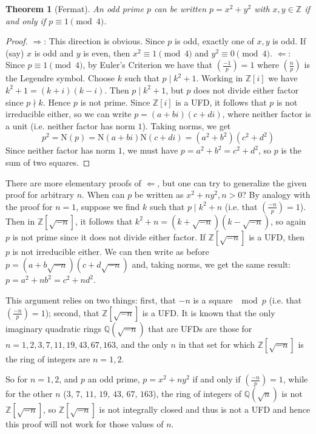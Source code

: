 \documentclass[12pt]{article}
\newcommand{\BZ}{\mathbb{Z}}
\newcommand{\BQ}{\mathbb{Q}}
\newtheorem{thm}{Theorem}
\begin{document}
\begin{thm}[Fermat] An odd prime $p$ can be written $p=x^2+y^2$ with $x,y\in\BZ$ if and only if $p \equiv 1 \pmod 4$.
\end{thm}

\begin{proof}
$\Rightarrow$: This direction is obvious. Since $p$ is odd, exactly one of $x,y$ is odd. If (say) $x$ is odd and $y$ is even, then $x^2\equiv 1\pmod 4$ and $y^2\equiv 0\pmod 4$.
\newline
$\Leftarrow$: Since $p \equiv 1 \pmod 4$, by Euler's Criterion we have that $\left(\frac{-1}{p}\right)=1$ where $\left(\frac{n}{p}\right)$ is the Legendre symbol. Choose $k$ such that $p\mid k^2+1$. Working in $\BZ[i]$ we have $k^2+1=(k+i)(k-i)$. Then $p\mid k^2+1$, but $p$ does not divide either factor since $p\nmid k$. Hence $p$ is not prime. Since $\BZ[i]$ is a UFD, it follows that $p$ is not irreducible either, so we can write $p=(a+bi)(c+di)$, where neither factor is a unit (i.e. neither factor has norm $1$). Taking norms, we get 
\[
  p^2 = \textrm{N}(p)=\textrm{N}(a+bi)\textrm{N}(c+di)=(a^2+b^2)(c^2+d^2)
\]
Since neither factor has norm $1$, we must have $p=a^2+b^2=c^2+d^2$, so $p$ is the sum of two squares.
\end{proof}

There are more elementary proofs of $\Leftarrow$, but one can try to generalize the given proof for arbitrary $n$. When can $p$ be written as $x^2+ny^2, n>0$? By analogy with the proof for $n=1$, suppose we find $k$ such that $p\mid k^2+n$ (i.e. that $\left(\frac{-n}{p}\right)=1$). Then in $\BZ[\sqrt{-n}]$, it follows that $k^2+n=(k+\sqrt{-n})(k-\sqrt{-n})$, so again $p$ is not prime since it does not divide either factor. If $\BZ[\sqrt{-n}]$ is a UFD, then $p$ is not irreducible either. We can then write as before $p=(a+b\sqrt{-n})(c+d\sqrt{-n})$ and, taking norms, we get the same result: $p=a^2+nb^2=c^2+nd^2$.

This argument relies on two things: first, that $-n$ is a square $\mod p$ (i.e. that $\left(\frac{-n}{p}\right)=1$); second, that $\BZ[\sqrt{-n}]$ is a UFD. It is known that the only imaginary quadratic rings $\BQ(\sqrt{-n})$ that are UFDs are those for $n=1,2,3,7,11,19,43,67,163$, and the only $n$ in that set for which $\BZ[\sqrt{-n}]$ is the ring of integers are $n=1,2$.

So for $n=1,2$, and $p$ an odd prime, $p=x^2+ny^2$ if and only if $\left(\frac{-n}{p}\right)=1$, while for the other $n$ ($3,\,7,\,11,\,19,\,43,\,67,\,163$), the ring of integers of $\BQ(\sqrt{n})$ is not $\BZ[\sqrt{-n}]$, so $\BZ[\sqrt{-n}]$ is not integrally closed and thus is not a UFD and hence this proof will not work for those values of $n$.
\end{document}
